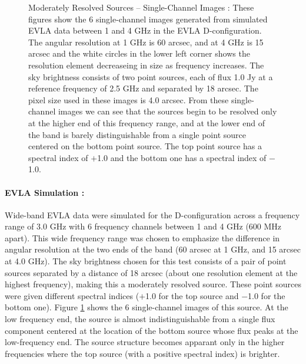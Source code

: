 \documentclass[structabstract]{stylefiles/aa}
\begin{document}
\begin{figure}[t!]
\begin{center}
\end{center}
\caption[Moderately Resolved Sources : Single-Channel Images]
{\small Moderately Resolved Sources -- Single-Channel Images : 
These figures show the 6 single-channel images generated from simulated
EVLA data between 1 and 4 GHz in the EVLA D-configuration. 
The angular resolution at 1 GHz is 60 arcsec, and at 4 GHz is 15 arcsec
and the white circles in the lower left corner shows the resolution
element decreaseing in size as frequency increases.
The sky brightness consists of two point sources, each of flux 1.0 Jy at
a reference frequency of 2.5 GHz and separated by 18 arcsec.
The pixel size used in these images is 4.0 arcsec.
From these single-channel images we can see that the sources begin to 
be resolved only at the higher end of this frequency range, and at the
lower end of the band is barely distinguishable from a single point source
centered on the bottom point source. 
The top point source has a 
spectral index of $+$1.0  %
and the bottom one has a spectral index of $-$1.0.
}
\label{Fig:modres_channel}
\end{figure}
\paragraph{EVLA Simulation : }
Wide-band EVLA data were simulated for the D-configuration
across a frequency range of 3.0 GHz 
with 6 frequency channels between 1 and 4 GHz (600 MHz apart).
This wide
frequency range was chosen to emphasize the difference in angular resolution
at the two ends of the band (60 arcsec at 1 GHz, and 15 arcsec at 4.0 GHz).
The sky brightness chosen for this test consists of a pair of
point sources separated by a distance of 18 arcsec (about one resolution
element at the highest frequency), making this a moderately resolved
source. These point sources were given different spectral indices
($+$1.0 for the top source and $-$1.0 for the bottom one).
Figure \ref{Fig:modres_channel} shows the 6 single-channel images of this
source.
At the low frequency end, the source is almost indistinguishable 
from a single flux component centered at the location of the bottom source
whose flux peaks at the low-frequency end. The source structure becomes
apparant only in the higher frequencies where the top source (with a positive
spectral index) is brighter.
%
\end{document}
